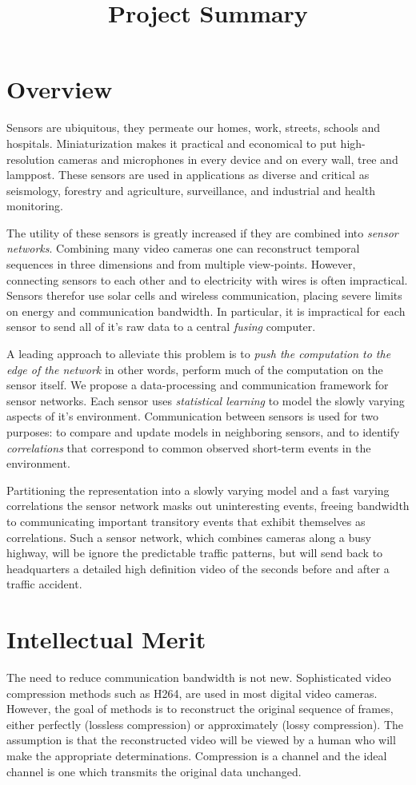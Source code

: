 \documentclass{article}
\title{Project Summary}
\begin{document}
\section{Overview}
Sensors are ubiquitous, they permeate our homes, work, streets, schools and hospitals.
Miniaturization makes it practical and economical to put high-resolution cameras and microphones in every device and on every wall, tree and lamppost. These sensors are used in applications as diverse and critical as seismology, forestry and agriculture, surveillance, and industrial and health monitoring. 

The utility of these sensors is greatly increased if they are combined into {\em sensor networks}. Combining many
video cameras one can reconstruct temporal sequences in three dimensions and from multiple view-points. However, connecting sensors to each other and to electricity with wires is often impractical. Sensors therefor use solar cells and wireless communication, placing severe limits on energy and communication bandwidth. In particular, it is impractical for each sensor to send all of it's raw data to a central {\em fusing} computer.  

A leading approach to alleviate this problem is to {\em push the computation to the edge of the network} in other words, perform much of the computation on the sensor itself. We propose 
a data-processing and communication framework for sensor networks. Each sensor uses {\em
  statistical learning} to model the slowly varying aspects of it's environment. Communication between sensors is used for two purposes: 
  to compare and update models in neighboring sensors, and to identify {\em correlations} that correspond to common observed short-term events in the environment.

Partitioning the representation into a slowly varying model and a fast varying correlations the sensor network masks out uninteresting events, freeing bandwidth to communicating important transitory events that exhibit themselves as correlations. Such a sensor network, which combines cameras along a busy highway, will be ignore the predictable traffic patterns, but will send back to headquarters a detailed high definition video of the seconds before and after a traffic accident.

\section{Intellectual Merit}
The need to reduce communication bandwidth is not new. Sophisticated video compression methods such as H264, are used in most digital video cameras. However, the goal of methods is to reconstruct the original sequence of frames, either perfectly (lossless compression) or approximately (lossy compression). The assumption is that the reconstructed video will be viewed by a human who will make the appropriate determinations. Compression is a channel and the ideal channel is one which transmits the original data unchanged.
\end{document}
